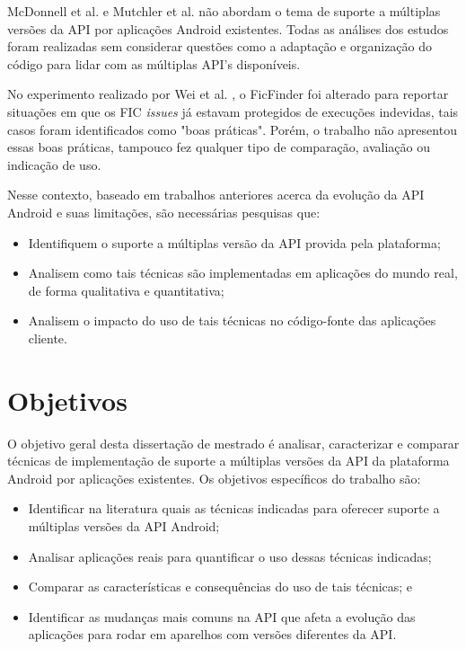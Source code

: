 McDonnell et al. \cite{McDonnell2013} e Mutchler et al. \cite{Mutchler2016}
não abordam o tema de suporte a múltiplas versões da API
por aplicações Android existentes. Todas as análises dos estudos foram
realizadas sem considerar questões como a adaptação e organização do código para
lidar com as múltiplas API's disponíveis.

No experimento realizado por Wei et al. \cite{Wei2016}, o FicFinder foi
alterado para reportar situações em que os FIC \textit{issues} já estavam protegidos
de execuções indevidas, tais casos foram identificados como "boas práticas". Porém,
o trabalho não apresentou essas boas práticas, tampouco fez qualquer tipo de
comparação, avaliação ou indicação de uso.

Nesse contexto, baseado em trabalhos anteriores acerca da evolução da API Android
e suas limitações, são necessárias pesquisas que:
\begin{itemize}
    \item Identifiquem o suporte a múltiplas versão da API provida pela plataforma;
    \item Analisem como tais técnicas são implementadas em aplicações do mundo
        real, de forma qualitativa e quantitativa;
    \item Analisem o impacto do uso de tais técnicas no código-fonte das aplicações
        cliente.   
\end{itemize}

\section{Objetivos} \label{sec:objetivos-gerais-especificos}

O objetivo geral desta dissertação de mestrado é analisar, caracterizar e comparar
técnicas de implementação de suporte a múltiplas versões da API da plataforma
Android por aplicações existentes. Os objetivos específicos do trabalho são:
\begin{itemize}
	\item Identificar na literatura quais as técnicas indicadas para oferecer suporte
	a múltiplas versões da API Android;
	\item Analisar aplicações reais para quantificar o uso dessas técnicas indicadas;
	\item Comparar as características e consequências do uso de tais técnicas; e
	\item Identificar as mudanças mais comuns na API que afeta a evolução das
	aplicações para rodar em aparelhos com versões diferentes da API.
\end{itemize}

